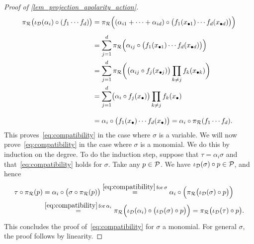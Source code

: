 \documentclass[a4paper,11pt,reqno]{amsart}
\numberwithin{equation}{section}
\theoremstyle{definition}
\theoremstyle{plain}
\theoremstyle{remark}
\begin{document}
\begin{proof}[Proof of \autoref{lem_projection_apolarity_action}]
\begin{align}
\label{rel_action_variables}
\nonumber\pi_{\mathcal{R}}\bigl(\iota_{\mathcal{D}}(\alpha_i)\circ (f_1\cdots
f_d)\bigr)&=\pi_{\mathcal{R}}\Bigl((\alpha_{i1}+\cdots+\alpha_{id})\circ
\bigl(f_1(x_{\bullet 1})\cdots f_d(x_{\bullet d})\bigr)\Bigr)\\[1ex]
&\nonumber=\sum_{j=1}^d\pi_{\mathcal{R}}\Bigl(\alpha_{ij}\circ\bigl(f_1(x_{\bullet
1})\cdots f_d(x_{\bullet d})\bigr)\Bigr)\\
&\nonumber=\sum_{j=1}^d\pi_{\mathcal{R}}\biggl(\bigl(\alpha_{ij}\circ f_j(x_{\bullet
j})\bigr)\prod_{k\neq j}f_k(x_{\bullet k})\biggr)\\
&\nonumber=\sum_{j=1}^d\bigl(\alpha_{i}\circ
f_j(x_{\bullet})\bigr)\prod_{k\neq j}f_k(x_{\bullet})\\[2ex]
&=\alpha_i\circ \bigl(f_1(x_{\bullet})\cdots
f_d(x_{\bullet})\bigr)=\alpha_i\circ\pi_{\mathcal{R}}(f_1\cdots f_d).
\end{align}
This proves~\eqref{eq:compatibility} {in the case where $\sigma$ is a variable}. We will now
prove~\eqref{eq:compatibility} in the case where $\sigma$ is a monomial. We do this by induction
on the degree. To do the induction step, suppose that $\tau = \alpha_i\sigma$ and that~\eqref{eq:compatibility} holds for $\sigma$. Take any $p\in
\mathcal{P}$. We have
$\iota_{\mathcal{D}}(\sigma)\circ p\in \mathcal{P}$, and hence
\begin{align*}
    \tau\circ \pi_{\mathcal{R}}(p) &= \alpha_i \circ \bigl(\sigma \circ \pi_{\mathcal{R}}(p)\bigr)
    \stackrel{\eqref{eq:compatibility}\,\mathrm{for}\,\sigma}{=} \alpha_i
    \circ \Bigl(\pi_{\mathcal{R}}\bigl(\iota_{\mathcal{D}}(\sigma)\circ p\bigr)\Bigr)\\
    &\stackrel{\eqref{eq:compatibility}\,\mathrm{for}\,\alpha_i}{=} \pi_{\mathcal{R}}\Bigl(\iota_{\mathcal{D}}(\alpha_i)\circ
    \bigl(\iota_{\mathcal{D}}(\sigma)\circ p\bigr)\Bigr) = \pi_{\mathcal{R}}\bigl(\iota_{\mathcal{D}}(\tau)\circ p\bigr).
\end{align*}
This concludes the proof of~\eqref{eq:compatibility} for $\sigma$ a monomial.
For general $\sigma$, the proof follows by linearity.
\end{proof}
\end{document}

